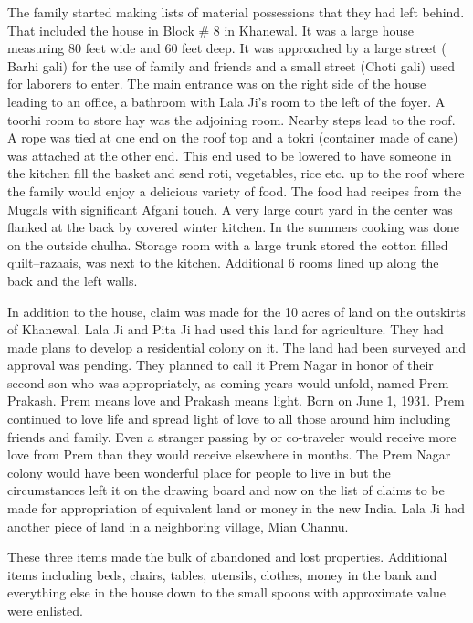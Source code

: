 The family started making lists of material possessions that they had left behind. That included the  house in Block # 8 in Khanewal. It was a large house measuring 80 feet wide and 60 feet deep. It was approached by a large street ( Barhi gali) for the use of family and friends and a small street (Choti gali) used for laborers to enter. The main entrance was on the right side of the house leading to an office, a bathroom with Lala Ji's room to the left of the foyer. A toorhi room to store hay was the adjoining room. Nearby steps lead to the roof. A rope was tied at one end on the roof top and a tokri (container made of cane) was attached at the other end. This end used to be lowered to have someone in the kitchen fill the basket and send roti, vegetables, rice etc. up to the roof where the family would enjoy a delicious variety of food. The food had recipes from the Mugals with significant Afgani touch.  A very large court yard in the center was flanked at the back by covered winter kitchen. In the summers cooking was done on the outside chulha. Storage room with a large trunk stored the cotton filled quilt--razaais, was next to the kitchen. Additional 6 rooms lined up along the back and the left walls. 

In addition to the house, claim was made for the 10 acres of land on the outskirts of Khanewal. Lala Ji and Pita Ji had used this land for agriculture. They had made plans to develop a residential colony on it. The land had been surveyed and approval was pending. They planned to call it Prem Nagar in honor of their second son who was appropriately, as coming years would unfold, named Prem Prakash. Prem means love and Prakash means light. Born on June 1, 1931. Prem continued to love life and spread light of love to all those around him including friends and family. Even a stranger passing by or co-traveler would receive more love from Prem than they would receive elsewhere in months. The Prem Nagar colony would have been wonderful place for people to live in but the circumstances left it on the drawing board and now on the list of claims to be made for appropriation of equivalent land or money in the new India. Lala Ji  had another piece of land in a neighboring village, Mian Channu. 

These three items made the bulk  of abandoned and lost properties. Additional items including beds, chairs, tables, utensils, clothes, money in the bank and everything else in the house down to the small spoons with approximate value were enlisted. 

